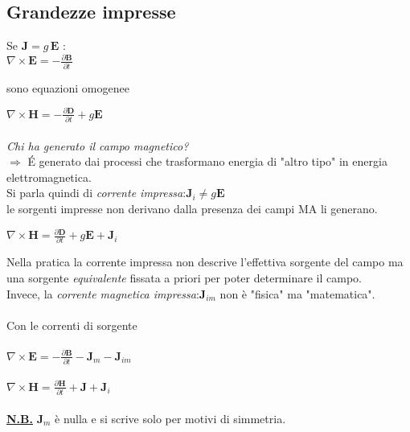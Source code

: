 \documentclass[a4paper]{article}
\begin{document}
\subsection*{Grandezze impresse}
Se $\textbf{J} = g\,\textbf{E}$ :\\
\hspace*{30mm}$\nabla\times\textbf{E} = -\frac{\partial\textbf{B}}{\partial t}$
\begin{flushright}
sono equazioni omogenee\\
\end{flushright}
\hspace*{30mm}$\nabla\times\textbf{H} = -\frac{\partial\textbf{D}}{\partial t} + g\textbf{E}$\\\\
\emph{Chi ha generato il campo magnetico?}\\
$\Rightarrow$ \'E generato dai processi che trasformano energia di "altro tipo" in energia elettromagnetica.\\
Si parla quindi di \emph{corrente impressa}:\hspace{5mm}$\textbf{J}_i \neq g\textbf{E}$\\
le sorgenti impresse non derivano dalla presenza dei campi MA li generano.\\
\begin{center}
$\nabla\times\textbf{H} = \frac{\partial\textbf{D}}{\partial t} + g\textbf{E} + \textbf{J}_i$\\
\end{center}
Nella pratica la corrente impressa non descrive l'effettiva sorgente del campo ma una sorgente \emph{equivalente} fissata a priori per poter determinare il campo.\\
Invece, la \emph{corrente magnetica impressa}:\hspace{5mm}$\textbf{J}_{im}$ non è "fisica" ma "matematica".\\\\
Con le correnti di sorgente\\\\
\hspace*{30mm}$\nabla\times\textbf{E} = -\frac{\partial\textbf{B}}{\partial t} - \textbf{J}_m - \textbf{J}_{im}$\\\\
\hspace*{30mm}$\nabla\times\textbf{H} = \frac{\partial\textbf{H}}{\partial t} + \textbf{J} + \textbf{J}_i$\\\\
\underline{\textbf{N.B.}} $\textbf{J}_m$ è nulla e si scrive solo per motivi di simmetria.\\\\
\end{document}
